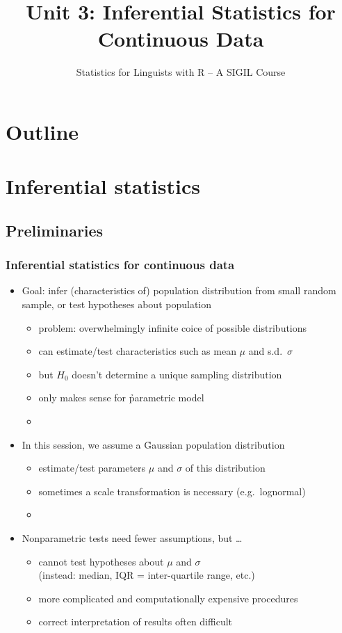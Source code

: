 \documentclass[t]{beamer} %
\title[3b.\ Continuous Data: Inference]{Unit 3: Inferential Statistics for Continuous Data}
\subtitle{Statistics for Linguists with R -- A SIGIL Course}
\date[sigil.r-forge.r-project.org]{%
  \light{\tiny \sigilcopyright}}
\begin{document}
\frame{\titlepage}


\section*{Outline}

\section{Inferential statistics}

\subsection{Preliminaries}

\begin{frame}
  \frametitle{Inferential statistics for continuous data}

  \begin{itemize}
  \item Goal: infer (characteristics of) population distribution from small
    random sample, or test hypotheses about population
    \begin{itemize}
    \item problem: overwhelmingly infinite coice of possible distributions
    \item can estimate/test characteristics such as mean $\mu$ and s.d.\ $\sigma$
    \item but $H_0$ doesn't determine a unique sampling distribution
    \item[\hand] only makes sense for \h{parametric} model
    \item[]
    \end{itemize}
  \item<2-> In this session, we assume a \h{Gaussian population} distribution%
    \begin{itemize}
    \item estimate/test parameters $\mu$ and $\sigma$ of this distribution 
    \item sometimes a scale transformation is necessary (e.g.\ lognormal)
    \item[]
    \end{itemize}
  \item<3-> Nonparametric tests need fewer assumptions, but \ldots
    \begin{itemize}
    \item cannot test hypotheses about $\mu$ and $\sigma$\\
      (instead: median, IQR = inter-quartile range, etc.)
    \item more complicated and computationally expensive procedures
    \item correct interpretation of results often difficult
    \end{itemize}
  \end{itemize}
\end{frame}
\end{document}
